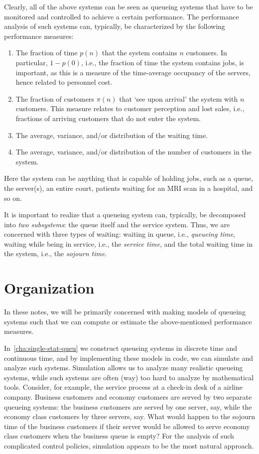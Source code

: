 Clearly, all of the above systems can be seen as queueing systems that have to be monitored and controlled to achieve a certain performance.
The performance analysis of such systems can, typically, be characterized by the following performance measures:
\begin{enumerate}
\item The fraction of time $p(n)$ that the system contains $n$ customers.
 In particular, $1-p(0)$, i.e., the fraction of time the system contains jobs, is important, as this is a measure of the time-average occupancy of the servers, hence related to personnel cost.
\item The fraction of customers $\pi(n)$ that `see upon arrival' the system with $n$ customers.
  This measure relates to customer perception and lost sales, i.e., fractions of arriving customers that do not enter the system.
\item The average, variance, and/or distribution of the waiting time.
\item The average, variance, and/or distribution of the number of customers in the system.\
\end{enumerate}
Here the system can be anything that is capable of holding jobs, such as a queue, the server(s), an entire court, patients waiting for an MRI scan in a hospital, and so on.

It is important to realize that a queueing system can, typically, be decomposed into \emph{two subsystems}: the queue itself and the service system.
Thus, we are concerned with three types of waiting: waiting in queue, i.e., \emph{queueing time}, waiting while being in service, i.e., the \emph{service time}, and the total waiting time in the system, i.e., the \emph{sojourn time}.

\section*{Organization}


In these notes, we will be primarily concerned with making models of queueing systems such that we can compute or estimate the above-mentioned performance measures.

In~\cref{cha:single-stat-queu} we construct queueing systems in discrete time and continuous time, and by implementing these models in code, we can simulate and analyze such systems.
Simulation allows us to analyze many realistic queueing systems, while such systems are often (way) too hard to analyze by mathematical tools.
Consider, for example, the service process at a check-in desk of a airline company.
Business customers and economy customers are served by two separate queueing systems: the business customers are served by one server, say, while the economy class customers by three servers, say.
What would happen to the sojourn time of the business customers if their server would be allowed to serve economy class customers when the business queue is empty?
For the analysis of such complicated control policies, simulation appears to be the most natural approach.

